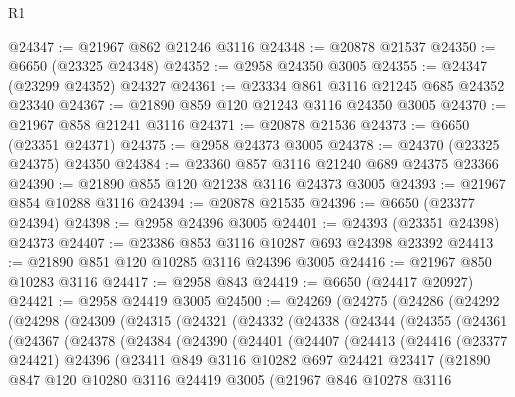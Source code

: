 \begin{lexlean}{R1}
\begin{coremodule}
@24347 := @21967 @862 @21246 @3116
@24348 := @20878 @21537
@24350 := @6650 (@23325 @24348)
@24352 := @2958 @24350 @3005
@24355 := @24347 (@23299 @24352) @24327
@24361 := @23334 @861 @3116 @21245 @685 @24352 @23340
@24367 := @21890 @859 @120 @21243 @3116 @24350 @3005
@24370 := @21967 @858 @21241 @3116
@24371 := @20878 @21536
@24373 := @6650 (@23351 @24371)
@24375 := @2958 @24373 @3005
@24378 := @24370 (@23325 @24375) @24350
@24384 := @23360 @857 @3116 @21240 @689 @24375 @23366
@24390 := @21890 @855 @120 @21238 @3116 @24373 @3005
@24393 := @21967 @854 @10288 @3116
@24394 := @20878 @21535
@24396 := @6650 (@23377 @24394)
@24398 := @2958 @24396 @3005
@24401 := @24393 (@23351 @24398) @24373
@24407 := @23386 @853 @3116 @10287 @693 @24398 @23392
@24413 := @21890 @851 @120 @10285 @3116 @24396 @3005
@24416 := @21967 @850 @10283 @3116
@24417 := @2958 @843
@24419 := @6650 (@24417 @20927)
@24421 := @2958 @24419 @3005
@24500 := @24269
    (@24275
      (@24286
        (@24292
          (@24298
            (@24309
              (@24315
                (@24321
                  (@24332
                    (@24338
                      (@24344
                        (@24355
                          (@24361
                            (@24367
                              (@24378
                                (@24384
                                  (@24390
                                    (@24401
                                      (@24407
                                        (@24413
                                          (@24416
                                            (@23377 @24421)
                                            @24396
                                            (@23411
                                              @849
                                              @3116
                                              @10282
                                              @697
                                              @24421
                                              @23417
                                              (@21890
                                                @847
                                                @120
                                                @10280
                                                @3116
                                                @24419
                                                @3005
                                                (@21967
                                                  @846
                                                  @10278
                                                  @3116

\end{coremodule}
\end{lexlean}
